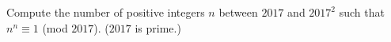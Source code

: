 Compute the number of positive integers $n$ between $2017$ and $2017^2$ such that $n^n \equiv 1$ (mod $2017$). ($2017$ is prime.)
